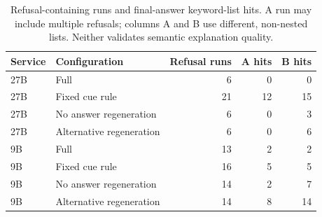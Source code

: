 \begin{table}[t]
\centering\small
\caption{Refusal-containing runs and final-answer keyword-list hits. A run may include multiple refusals; columns A and B use different, non-nested lists. Neither validates semantic explanation quality.}
\label{tab:markers}
\begin{tabular}{llrrr}
\toprule
Service & Configuration & Refusal runs & A hits & B hits \\
\midrule
27B & Full & 6 & 0 & 0 \\
27B & Fixed cue rule & 21 & 12 & 15 \\
27B & No answer regeneration & 6 & 0 & 3 \\
27B & Alternative regeneration & 6 & 0 & 6 \\
9B & Full & 13 & 2 & 2 \\
9B & Fixed cue rule & 16 & 5 & 5 \\
9B & No answer regeneration & 14 & 2 & 7 \\
9B & Alternative regeneration & 14 & 8 & 14 \\
\bottomrule
\end{tabular}
\end{table}
